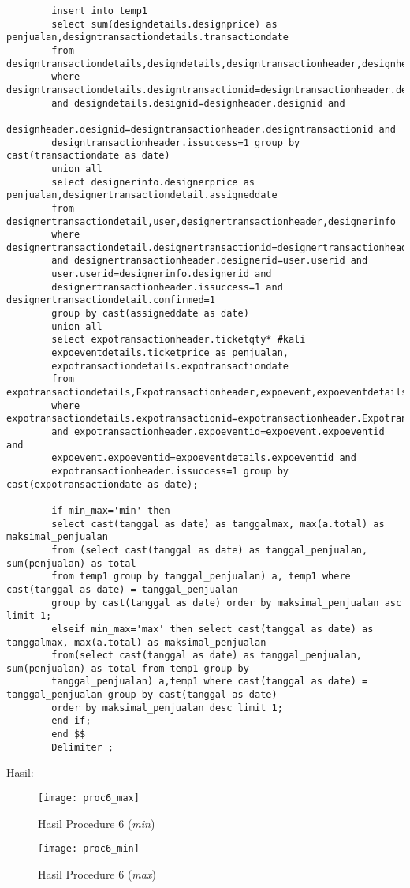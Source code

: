 \begin{enumerate}
\begin{lstlisting}
		insert into temp1
		select sum(designdetails.designprice) as penjualan,designtransactiondetails.transactiondate
		from designtransactiondetails,designdetails,designtransactionheader,designheader
		where designtransactiondetails.designtransactionid=designtransactionheader.designtransactionid
		and designdetails.designid=designheader.designid and 
		designheader.designid=designtransactionheader.designtransactionid and
		designtransactionheader.issuccess=1 group by cast(transactiondate as date)
		union all
		select designerinfo.designerprice as penjualan,designertransactiondetail.assigneddate
		from designertransactiondetail,user,designertransactionheader,designerinfo
		where designertransactiondetail.designertransactionid=designertransactionheader.designertransactionid
		and designertransactionheader.designerid=user.userid and
		user.userid=designerinfo.designerid and
		designertransactionheader.issuccess=1 and designertransactiondetail.confirmed=1 
		group by cast(assigneddate as date)
		union all
		select expotransactionheader.ticketqty* #kali
		expoeventdetails.ticketprice as penjualan,
		expotransactiondetails.expotransactiondate
		from expotransactiondetails,Expotransactionheader,expoevent,expoeventdetails
		where expotransactiondetails.expotransactionid=expotransactionheader.Expotransactionid
		and expotransactionheader.expoeventid=expoevent.expoeventid and
		expoevent.expoeventid=expoeventdetails.expoeventid and
		expotransactionheader.issuccess=1 group by cast(expotransactiondate as date);
		
		if min_max='min' then
		select cast(tanggal as date) as tanggalmax, max(a.total) as maksimal_penjualan
		from (select cast(tanggal as date) as tanggal_penjualan, sum(penjualan) as total 
		from temp1 group by tanggal_penjualan) a, temp1 where cast(tanggal as date) = tanggal_penjualan
		group by cast(tanggal as date) order by maksimal_penjualan asc limit 1;
		elseif min_max='max' then select cast(tanggal as date) as tanggalmax, max(a.total) as maksimal_penjualan
		from(select cast(tanggal as date) as tanggal_penjualan, sum(penjualan) as total from temp1 group by
		tanggal_penjualan) a,temp1 where cast(tanggal as date) = tanggal_penjualan group by cast(tanggal as date)
		order by maksimal_penjualan desc limit 1;
		end if;
		end $$
		Delimiter ;
	\end{lstlisting}
	Hasil:
	\\
	\begin{figure}[H]
		\centering
		\texttt{[image: proc6\_max]}
		\caption{Hasil Procedure 6 (\textit{min})}
	\end{figure}
	\begin{figure}[H]
	\centering
	\texttt{[image: proc6\_min]}
	\caption{Hasil Procedure 6 (\textit{max})}
\end{figure}
\end{enumerate}